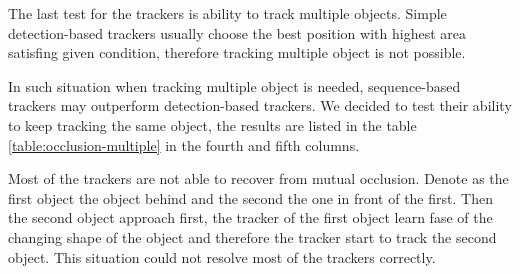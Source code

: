 The last test for the trackers is ability to track multiple objects. Simple
detection-based trackers usually choose the best position with highest area
satisfing given condition, therefore tracking multiple object is not possible.

In such situation when tracking multiple object is needed, sequence-based
trackers may outperform detection-based trackers. We decided to test their
ability to keep tracking the same object, the results are listed in the table
\ref{table:occlusion-multiple} in the fourth and fifth columns.

Most of the trackers are not able to recover from mutual occlusion. Denote as
the first object the object behind and the second the one in front of the
first. Then the second object approach first, the tracker of the first object
learn fase of the changing shape of the object and therefore the tracker start
to track the second object. This situation could not resolve most of the
trackers correctly.

